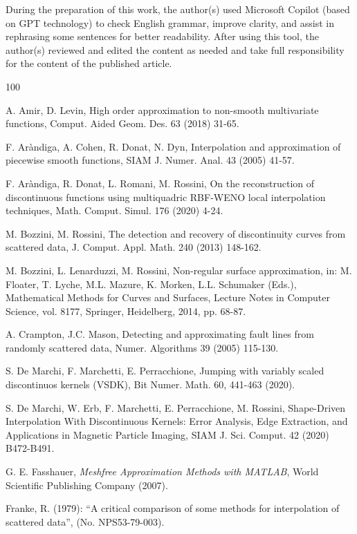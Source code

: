 \documentclass[preprint]{elsarticle}       %
\begin{document}
During the preparation of this work, the author(s) used Microsoft Copilot (based on GPT technology) to check English grammar, improve clarity, and assist in rephrasing some sentences for better readability. After using this tool, the author(s) reviewed and edited the content as needed and take full responsibility for the content of the published article.

\begin{thebibliography}{100}

 A. Amir, D. Levin, High order approximation to non-smooth multivariate functions, Comput. Aided Geom. Des. 63 (2018) 31-65.

 F. Ar\`andiga, A. Cohen, R. Donat, N. Dyn, Interpolation and approximation of piecewise smooth functions, SIAM J. Numer. Anal. 43 (2005) 41-57.

 F. Ar\`andiga, R. Donat, L. Romani, M. Rossini, On the reconstruction of discontinuous functions using multiquadric RBF-WENO local interpolation techniques, Math. Comput. Simul. 176 (2020) 4-24.

 M. Bozzini, M. Rossini, The detection and recovery of discontinuity curves from scattered data, J. Comput. Appl. Math. 240 (2013) 148-162.

 M. Bozzini, L. Lenarduzzi, M. Rossini, Non-regular surface approximation, in: M. Floater, T. Lyche, M.L. Mazure, K. Morken, L.L. Schumaker (Eds.), Mathematical Methods for Curves and Surfaces, Lecture Notes in Computer Science, vol. 8177, Springer, Heidelberg, 2014, pp. 68-87.

 A. Crampton, J.C. Mason, Detecting and approximating fault lines from randomly scattered data, Numer. Algorithms 39 (2005) 115-130.

 S. De Marchi, F. Marchetti, E. Perracchione, Jumping with variably scaled discontinuos kernels (VSDK), Bit Numer. Math. 60, 441-463 (2020).

 S. De Marchi, W. Erb, F. Marchetti, E. Perracchione, M. Rossini, Shape-Driven Interpolation With Discontinuous Kernels: Error Analysis, Edge Extraction, and Applications in Magnetic Particle Imaging, SIAM J. Sci. Comput. 42 (2020) B472-B491.

 G. E. Fasshauer, \textit{Meshfree Approximation Methods with MATLAB}, World Scientific Publishing Company (2007).

  Franke, R. (1979): ``A critical comparison of some methods for interpolation of scattered data'', (No. NPS53-79-003).


\end{thebibliography}
\end{document}
